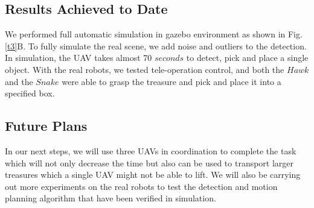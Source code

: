 \documentclass{standalone}
\begin{document}
\subsection{Results Achieved to Date}
We performed full automatic simulation in gazebo environment as shown in Fig.\ref{t3}B. To fully simulate the real scene, we add noise and outliers to the detection. In simulation, the UAV takes almost 70 $seconds$ to detect, pick and place a single object. 
With the real robots, we tested tele-operation control, and both the $Hawk$ and the $Snake$ were able to grasp the treasure and pick and place it into a specified box. 

\subsection{Future Plans}
In our next steps, we will use three UAVs in coordination to complete the task which will not only decrease the time but also can be used to transport larger treasures which a single UAV might not be able to lift. We will also be carrying out more experiments on the real robots to test the detection and motion planning algorithm that have been verified in simulation.
\end{document}
